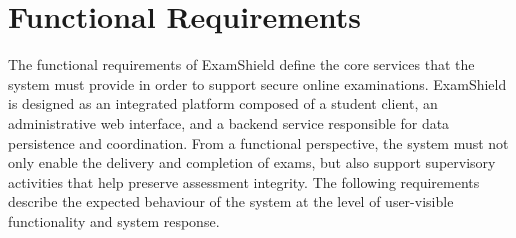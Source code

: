 \section{Functional Requirements}

The functional requirements of ExamShield define the core services that the system must provide in order to support secure online examinations. ExamShield is designed as an integrated platform composed of a student client, an administrative web interface, and a backend service responsible for data persistence and coordination. From a functional perspective, the system must not only enable the delivery and completion of exams, but also support supervisory activities that help preserve assessment integrity. The following requirements describe the expected behaviour of the system at the level of user-visible functionality and system response.

